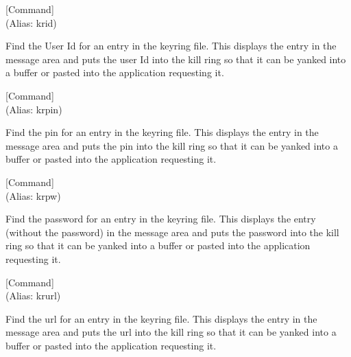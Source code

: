\vspace{1em}
\noindent
{}
\usebox{\funcname}
 \hfill [Command]\\%
 (Alias: krid)

\begin{doc-string}
Find the User Id for an entry in the keyring file.  This displays the entry
in the message area and puts the user Id into the kill ring so that it can be
yanked into a buffer or pasted into the application requesting it.
\end{doc-string}

\vspace{1em}
\noindent
{}
\usebox{\funcname}
 \hfill [Command]\\%
 (Alias: krpin)

\begin{doc-string}
Find the pin for an entry in the keyring file.  This displays the entry in
the message area and puts the pin into the kill ring so that it can be yanked
into a buffer or pasted into the application requesting it.
\end{doc-string}

\vspace{1em}
\noindent
{}
\usebox{\funcname}
 \hfill [Command]\\%
 (Alias: krpw)

\begin{doc-string}
Find the password for an entry in the keyring file.  This displays the entry
(without the password) in the message area and puts the password into the kill
ring so that it can be yanked into a buffer or pasted into the application
requesting it.
\end{doc-string}

\vspace{1em}
\noindent
{}
\usebox{\funcname}
 \hfill [Command]\\%
 (Alias: krurl)

\begin{doc-string}
Find the url for an entry in the keyring file.  This displays the entry in
the message area and puts the url into the kill ring so that it can be yanked
into a buffer or pasted into the application requesting it.
\end{doc-string}

